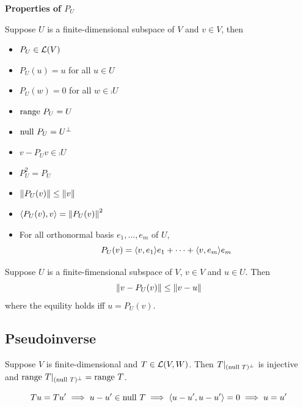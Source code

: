 \documentclass[12pt,a4paper]{article}
\begin{document}
    \begin{prop}
        \textbf{Properties of $P_{U}$}

        Suppose $U$ is a finite-dimensional subspace of $V$ and $v\in V$, then
        \begin{itemize}
            \item $P_{U}\in\mathcal{L}(V)$
            \item $P_{U}(u)=u$ for all $u\in U$
            \item $P_{U}(w)=0$ for all $w\in\comp{U}$
            \item $\operatorname{range\,} P_{U}=U$
            \item $\operatorname{null\,} P_{U}=U^{\perp}$
            \item $v-P_{U}v\in\comp{U}$
            \item $P_{U}^2=P_{U}$
            \item $\left\lVert P_{U}(v)\right\rVert\leq\left\lVert v\right\rVert$
            \item $\langle P_U(v),v\rangle=\left\lVert P_U(v)\right\rVert^2$
            \item For all orthonormal basis $e_1,\dots,e_m$ of $U$,
            $$
            P_{U}(v)=\langle v,e_1\rangle e_1+\cdots+\langle v,e_m\rangle e_m
            $$
        \end{itemize}
    \end{prop}
    \hfill
    
    \begin{prop}
        Suppose $U$ is a finite-fimensional subspace of $V$, $v\in V$ and $u\in U$. Then
        $$
        \left\lVert v-P_{U}(v)\right\rVert\leq\left\lVert v-u\right\rVert
        $$
        where the equility holds iff $u=P_U(v)$.
    \end{prop}
    \hfill

    \subsection{Pseudoinverse}
    \begin{prop}
        Suppose $V$ is finite-dimensional and $T\in\mathcal{L}(V,W)$. Then $T|_{(\operatorname{null\,} T)^{\perp}}$ is injective and $\operatorname{range\,} T|_{(\operatorname{null\,} T)^{\perp}}=\operatorname{range\,} T$.
    \end{prop}
    \begin{remark}
        $$
        Tu=Tu'\implies u-u'\in\operatorname{null\,} T\implies\langle u-u',u-u'\rangle=0\implies u=u'
        $$
    \end{remark}
    \hfill
\end{document}

